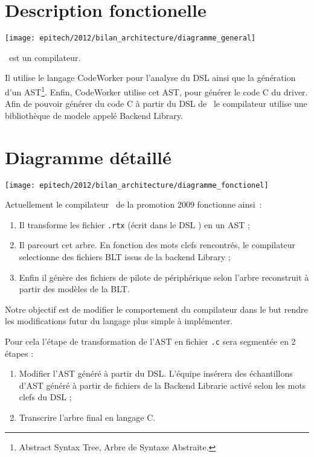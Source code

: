 \documentclass{rtxreport}
\begin{document}
\section{Description fonctionelle}

\texttt{[image: epitech/2012/bilan\_architecture/diagramme\_general]}

\rtx\ est un compilateur.

Il utilise le langage CodeWorker pour l'analyse du DSL ainsi que la génération
d'un AST\footnote{Abstract Syntax Tree, Arbre de Syntaxe Abstraite.}. Enfin,
CodeWorker utilise cet AST, pour générer le code C du driver. Afin de pouvoir
générer du code C à partir du DSL de \rtx\, le compilateur utilise une
bibliothèque de modele appelé Backend Library. %

\section{Diagramme détaillé}

\texttt{[image: epitech/2012/bilan\_architecture/diagramme\_fonctionel]}

Actuellement le compilateur \rtx\ de la promotion 2009 fonctionne ainsi~:
\begin{enumerate}
\item Il transforme les fichier \texttt{.rtx} (écrit dans le DSL \rtx) en un AST ;
\item Il parcourt cet arbre. En fonction des mots clefs rencontrés, le
compilateur selectionne des fichiers BLT issus de la backend Library ; %
\item Enfin il génère des fichiers de pilote de périphérique selon l'arbre
reconstruit à partir des modèles de la BLT.
\end{enumerate}

Notre objectif est de modifier le comportement du compilateur dans le but
rendre les modifications futur du langage plus simple à implémenter.

Pour cela l'étape de transformation de l'AST en fichier \texttt{.c} sera
segmentée en 2 étapes :
\begin{enumerate}
\item Modifier l'AST généré à partir du DSL. L'équipe insérera des échantillons
d'AST généré à partir de fichiers de la Backend Librarie activé selon les mots
clefs du DSL ;
\item Transcrire l'arbre final en langage C.
\end{enumerate}
\end{document}
